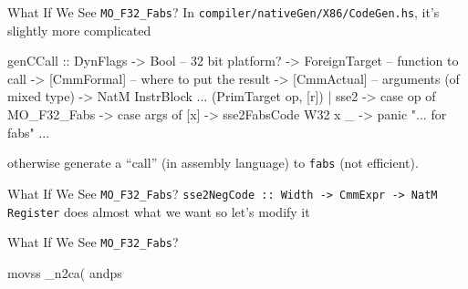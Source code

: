 \documentclass[presentation]{beamer}
\begin{document}
\begin{frame}[fragile]{What If We See \texttt{MO\_F32\_Fabs}?}
  In \texttt{compiler/nativeGen/X86/CodeGen.hs}, it's slightly more complicated
  \begin{haskelL}
  genCCall
    :: DynFlags
    -> Bool                     -- 32 bit platform?
    -> ForeignTarget            -- function to call
    -> [CmmFormal]        -- where to put the result
    -> [CmmActual]        -- arguments (of mixed type)
    -> NatM InstrBlock
    ...
    (PrimTarget op, [r])
      | sse2 -> case op of
          MO_F32_Fabs -> case args of
            [x] -> sse2FabsCode W32 x
            _ -> panic "... for fabs"
    ...
  \end{haskelL}
  otherwise generate a ``call'' (in assembly language) to
  \texttt{fabs} (not efficient).
\end{frame}


\begin{frame}[fragile]{What If We See \texttt{MO\_F32\_Fabs}?}
  \texttt{sse2NegCode :: Width -> CmmExpr -> NatM Register} does almost what we want so let's modify it
\end{frame}

\begin{frame}[fragile]{What If We See \texttt{MO\_F32\_Fabs}?}

  \begin{ASM}
    movss _n2ca(%
    andps %
  \end{ASM}
\end{frame}

\end{document}
